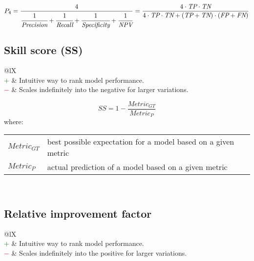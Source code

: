 \documentclass{article}
\makeatletter
\newenvironment{conditions}[1][where:]
    {\hspace{0.02\textwidth} #1 \begin{tabular}[t]{>{$}l<{$} @{${}={}$} l}}
    {\end{tabular}\\[\belowdisplayskip]}
\makeatother
\begin{document}
\begin{equation}
    P_4 = \dfrac{4}{\cfrac{1}{\textit{Precision}} + \cfrac{1}{\textit{Recall}} + \cfrac{1}{\textit{Specificity}} + \cfrac{1}{\textit{NPV}}} = \dfrac{4 \cdot \textit{TP} \cdot \textit{TN}}{4 \cdot \textit{TP} \cdot \textit{TN} + (\textit{TP} + \textit{TN}) \cdot (\textit{FP} + \textit{FN})}
%
    \label{equation:P4_metric}
\end{equation}


\subsection[Skill score (SS)]{Skill score (SS) \cite{murphy1988skill}}

\begin{table}[H]\centering
    \begin{tabularx}{\textwidth}{@{}lX}
        \multicolumn{2}{@{}X}{Measures the quality of a prediction against a reference. (range: $(-\infty, 1]$)} \\
        \textcolor{Green}{$+$} & Intuitive way to rank model performance. \\
        \textcolor{Red}{$-$}   & Scales indefinitely into the negative for larger variations.
    \end{tabularx}
\end{table}

\begin{equation}
    \textit{SS} = 1 - \dfrac{\textit{Metric}_\textit{GT}}{\textit{Metric}_P}
%
    \label{equation:SS}
\end{equation}
%
\begin{conditions}
    \textit{Metric}_\textit{GT} & best possible expectation for a model based on a given metric \\
    \textit{Metric}_P           & actual prediction of a model based on a given metric
\end{conditions}


\subsection[Relative improvement factor]{Relative improvement factor \cite{schlosser2022improving}}

\begin{table}[H]\centering
    \begin{tabularx}{\textwidth}{@{}lX}
        \multicolumn{2}{@{}X}{Measures the relative quality of a prediction against a reference. (range: $[0, \infty)$)} \\
        \textcolor{Green}{$+$} & Intuitive way to rank model performance. \\
        \textcolor{Red}{$-$}   & Scales indefinitely into the positive for larger variations.
    \end{tabularx}
\end{table}
\end{document}
